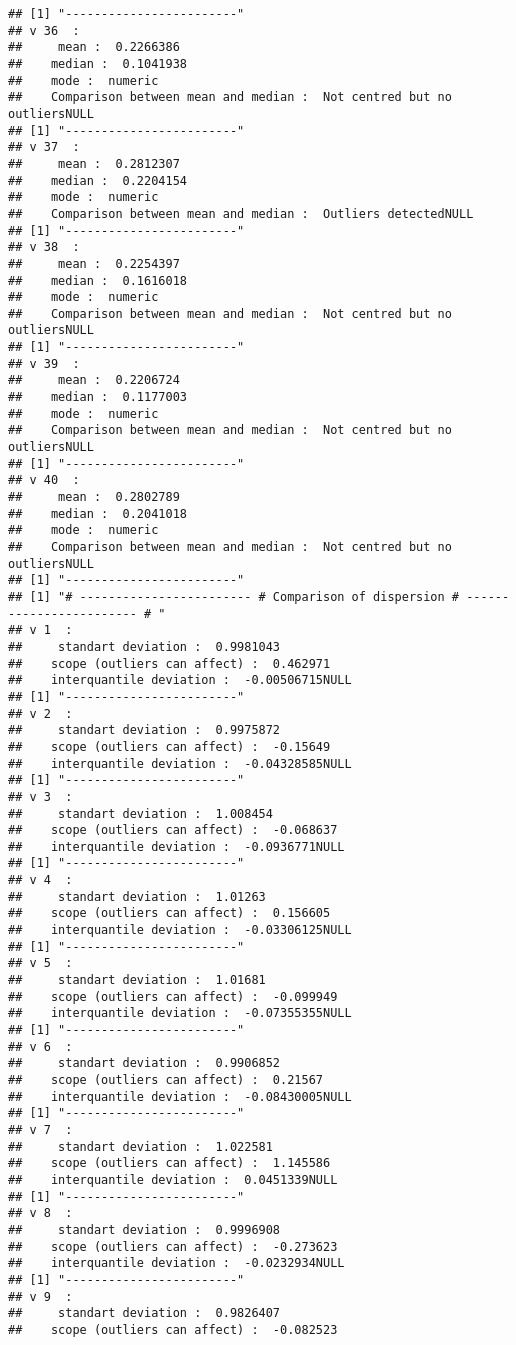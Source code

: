 \documentclass[]{article}
\begin{document}
\begin{verbatim}
## [1] "------------------------"
## v 36  : 
##     mean :  0.2266386 
##    median :  0.1041938 
##    mode :  numeric 
##    Comparison between mean and median :  Not centred but no outliersNULL
## [1] "------------------------"
## v 37  : 
##     mean :  0.2812307 
##    median :  0.2204154 
##    mode :  numeric 
##    Comparison between mean and median :  Outliers detectedNULL
## [1] "------------------------"
## v 38  : 
##     mean :  0.2254397 
##    median :  0.1616018 
##    mode :  numeric 
##    Comparison between mean and median :  Not centred but no outliersNULL
## [1] "------------------------"
## v 39  : 
##     mean :  0.2206724 
##    median :  0.1177003 
##    mode :  numeric 
##    Comparison between mean and median :  Not centred but no outliersNULL
## [1] "------------------------"
## v 40  : 
##     mean :  0.2802789 
##    median :  0.2041018 
##    mode :  numeric 
##    Comparison between mean and median :  Not centred but no outliersNULL
## [1] "------------------------"
## [1] "# ------------------------ # Comparison of dispersion # ------------------------ # "
## v 1  : 
##     standart deviation :  0.9981043 
##    scope (outliers can affect) :  0.462971 
##    interquantile deviation :  -0.00506715NULL
## [1] "------------------------"
## v 2  : 
##     standart deviation :  0.9975872 
##    scope (outliers can affect) :  -0.15649 
##    interquantile deviation :  -0.04328585NULL
## [1] "------------------------"
## v 3  : 
##     standart deviation :  1.008454 
##    scope (outliers can affect) :  -0.068637 
##    interquantile deviation :  -0.0936771NULL
## [1] "------------------------"
## v 4  : 
##     standart deviation :  1.01263 
##    scope (outliers can affect) :  0.156605 
##    interquantile deviation :  -0.03306125NULL
## [1] "------------------------"
## v 5  : 
##     standart deviation :  1.01681 
##    scope (outliers can affect) :  -0.099949 
##    interquantile deviation :  -0.07355355NULL
## [1] "------------------------"
## v 6  : 
##     standart deviation :  0.9906852 
##    scope (outliers can affect) :  0.21567 
##    interquantile deviation :  -0.08430005NULL
## [1] "------------------------"
## v 7  : 
##     standart deviation :  1.022581 
##    scope (outliers can affect) :  1.145586 
##    interquantile deviation :  0.0451339NULL
## [1] "------------------------"
## v 8  : 
##     standart deviation :  0.9996908 
##    scope (outliers can affect) :  -0.273623 
##    interquantile deviation :  -0.0232934NULL
## [1] "------------------------"
## v 9  : 
##     standart deviation :  0.9826407 
##    scope (outliers can affect) :  -0.082523 

\end{verbatim}
\end{document}
